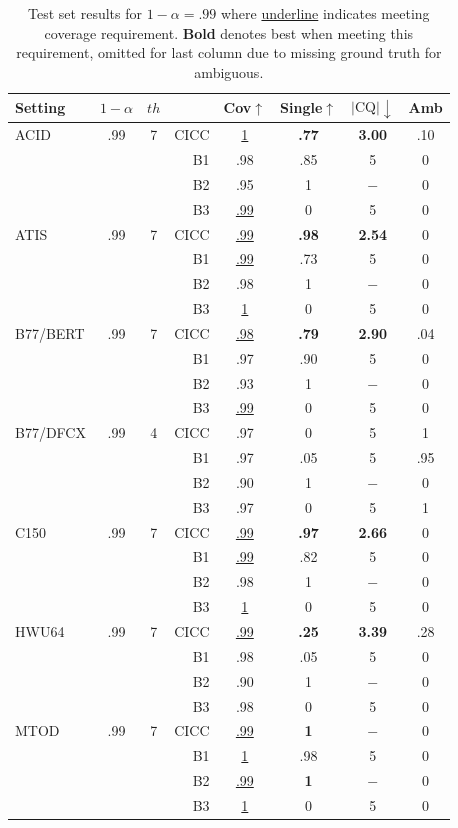 \begin{table}[h!]
\centering
\footnotesize{
\setlength\tabcolsep{2pt}
\begin{tabular}{lccr|cccc}
\toprule
Setting & $1-\alpha$ & $th$ &    & Cov$\uparrow$ & Single$\uparrow$ & $|\text{CQ}|\downarrow$ & Amb \\ \midrule
\midrule
ACID & .99 & 7   &  CICC & \underline{1} & \textbf{.77} & \textbf{3.00} & .10 \\
& & &  B1 & .98 & .85 & 5 & 0 \\
& & &  B2 & .95 & 1 & $-$ & 0 \\
& & &  B3 & \underline{.99} & 0 & 5 & 0 \\
\midrule
ATIS & .99 & 7  &  CICC & \underline{.99} & \textbf{.98} & \textbf{2.54} & 0 \\
& & &  B1 & \underline{.99} & .73 & 5 & 0 \\
& & &  B2 & .98 & 1 & $-$ & 0 \\
& & &  B3 & \underline{1} & 0 & 5 & 0 \\
\midrule
B77/BERT & .99 & 7  &  CICC & \underline{.98} & \textbf{.79} & \textbf{2.90} & .04 \\
& & &  B1 & .97& .90 & 5 & 0 \\
& & &  B2 & .93 & 1 & $-$ & 0 \\
& & &  B3 & \underline{.99} & 0 & 5 & 0 \\
\midrule
B77/DFCX & .99 & 4  &  CICC & .97 & 0 & 5 & 1 \\
& & &  B1 & .97 & .05 & 5 & .95 \\
& & &  B2 & .90 & 1 & $-$ & 0 \\
& & &  B3 & .97 & 0 & 5 & 1 \\
\midrule
C150 & .99 & 7  &  CICC & \underline{.99} & \textbf{.97} & \textbf{2.66} & 0 \\
& & &  B1 & \underline{.99} & .82 & 5 & 0 \\
& & &  B2 & .98 & 1 & $-$ & 0 \\
& & &  B3 & \underline{1} & 0 & 5 & 0 \\
\midrule
HWU64 & .99 & 7  &  CICC & \underline{.99} & \textbf{.25} & \textbf{3.39} & .28 \\
& & &  B1 & .98 & .05 & 5 & 0 \\
& & &  B2 & .90 & 1 & $-$ & 0 \\
& & &  B3 & .98 & 0 & 5 & 0 \\
\midrule
MTOD & .99 & 7  &  CICC & \underline{.99} & \textbf{1} & $-$ & 0 \\
& & &  B1 & \underline{1} & .98 & 5 & 0 \\
& & &  B2 & \underline{.99} & \textbf{1} & $-$ & 0 \\
& & &  B3 & \underline{1} & 0 & 5 & 0 \\
\bottomrule
\end{tabular}}
    \caption{Test set results for $1-\alpha=.99$ where \underline{underline} indicates meeting coverage requirement. \textbf{Bold} denotes best when meeting this requirement, omitted for last column due to missing ground truth for ambiguous.}
    \label{tab:results_unoptimized2}
\end{table}